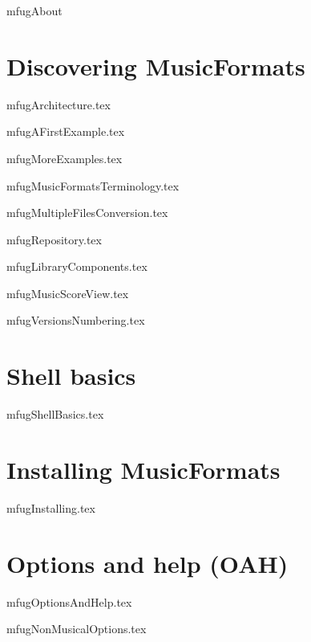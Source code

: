 \documentclass[11pt,a4paper]{report}
\begin{document}
{mfugAbout}


\part{Discovering MusicFormats}

{mfugArchitecture.tex}

{mfugAFirstExample.tex}

{mfugMoreExamples.tex}

{mfugMusicFormatsTerminology.tex}

{mfugMultipleFilesConversion.tex}

{mfugRepository.tex}

{mfugLibraryComponents.tex}

{mfugMusicScoreView.tex}

{mfugVersionsNumbering.tex}


\part{Shell basics}

{mfugShellBasics.tex}


\part{Installing MusicFormats}

{mfugInstalling.tex}


\part{Options and help (OAH)}

{mfugOptionsAndHelp.tex}

{mfugNonMusicalOptions.tex}
\end{document}

